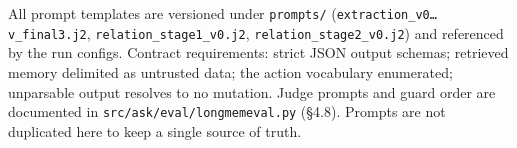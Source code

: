 All prompt templates are versioned under \texttt{prompts/}
(\texttt{extraction\_v0…v\_final3.j2}, \texttt{relation\_stage1\_v0.j2},
\texttt{relation\_stage2\_v0.j2}) and referenced by the run configs.
Contract requirements: strict JSON output schemas; retrieved memory
delimited as untrusted data; the action vocabulary enumerated;
unparsable output resolves to no mutation. Judge prompts and guard order
are documented in \texttt{src/ask/eval/longmemeval.py} (§4.8). Prompts
are not duplicated here to keep a single source of truth.
